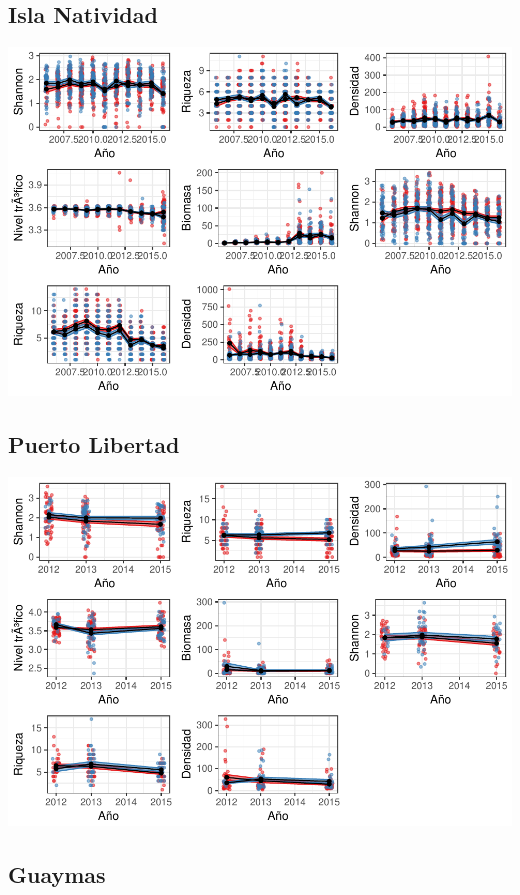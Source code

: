 \documentclass[12pt,]{article}
\begin{document}
\subsection{Isla Natividad}\label{isla-natividad}

\includegraphics{Manuscript_files/figure-latex/unnamed-chunk-7-1.pdf}

\subsection{Puerto Libertad}\label{puerto-libertad}

\includegraphics{Manuscript_files/figure-latex/unnamed-chunk-8-1.pdf}

\subsection{Guaymas}\label{guaymas}
\end{document}
